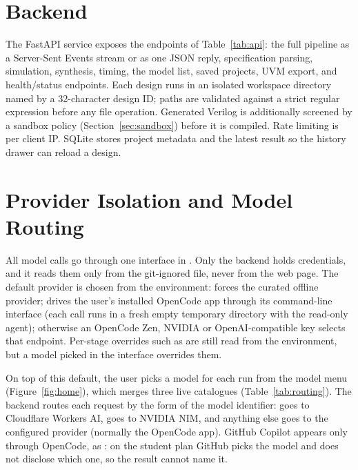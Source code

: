 \section{Backend}
The FastAPI service exposes the endpoints of Table~\ref{tab:api}: the
full pipeline as a Server-Sent Events stream or as one JSON reply,
specification parsing, simulation, synthesis, timing, the model list, saved
projects, UVM export, and health/status endpoints. Each
design runs in an isolated workspace directory named by a 32-character design ID;
paths are validated against a strict regular expression before any file operation. Generated Verilog is additionally screened by a sandbox policy (Section~\ref{sec:sandbox}) before it is compiled.
Rate limiting is per client IP. SQLite stores project metadata and the latest
result so the history drawer can reload a design.

\section{Provider Isolation and Model Routing}
\label{sec:routing}
All model calls go through one interface in . Only the backend
holds credentials, and it reads them only from the git-ignored 
file, never from the web page. The default provider is chosen from the environment:
 forces the curated offline provider; 
drives the user's installed OpenCode app through its command-line interface (each
call runs in a fresh empty temporary directory with the read-only  agent);
otherwise an OpenCode Zen, NVIDIA or OpenAI-compatible key selects that endpoint.
Per-stage overrides such as  are still read from the
environment, but a model picked in the interface overrides them.

On top of this default, the user picks a model for each run from the model menu
(Figure~\ref{fig:home}), which merges three live catalogues
(Table~\ref{tab:routing}). The backend routes each request by the form of the model
identifier:  goes to Cloudflare Workers AI,  goes to
NVIDIA NIM, and anything else goes to the configured provider (normally the OpenCode
app). GitHub Copilot appears only through OpenCode, as :
on the student plan GitHub picks the model and does not disclose which one, so the
result cannot name it.

